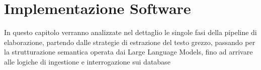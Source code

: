 \chapter{Implementazione Software}\label{chap:third}

\inlineminitoc

In questo capitolo verranno analizzate nel dettaglio le singole fasi della pipeline di elaborazione, partendo dalle strategie di estrazione del testo grezzo, passando per la strutturazione semantica operata dai Large Language Models, fino ad arrivare alle logiche di ingestione e interrogazione sui database










